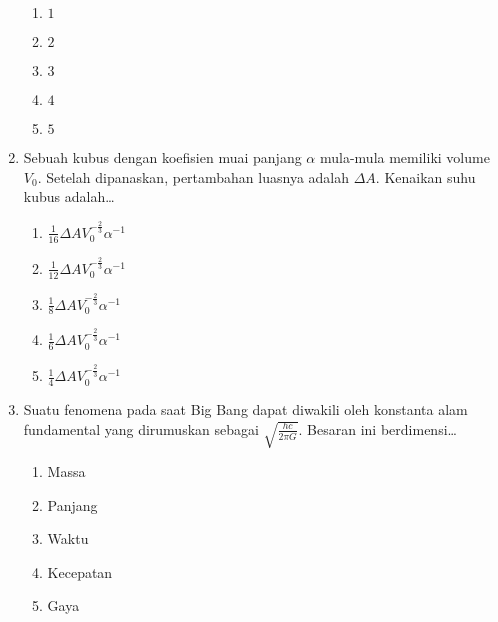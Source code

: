 \documentclass[A4,12PT, english, twocolumn]{journal}
\begin{document}
\begin{enumerate}
\begin{center}
\end{center}
    \begin{enumerate}
        \item $1$
        \item $2$
        \item $3$
        \item $4$
        \item $5$
    \end{enumerate}

\item Sebuah kubus dengan koefisien muai panjang $\alpha$ mula-mula memiliki volume $V_0$. Setelah dipanaskan, pertambahan luasnya adalah $\Delta A$. Kenaikan suhu kubus adalah\dots
    \begin{enumerate}
        \item $\frac{1}{16}\Delta AV_0^{-\frac{2}{3}}\alpha^{-1}$
        \item $\frac{1}{12}\Delta AV_0^{-\frac{2}{3}}\alpha^{-1}$
        \item $\frac{1}{8}\Delta AV_0^{-\frac{2}{3}}\alpha^{-1}$
        \item $\frac{1}{6}\Delta AV_0^{-\frac{2}{3}}\alpha^{-1}$
        \item $\frac{1}{4}\Delta AV_0^{-\frac{2}{3}}\alpha^{-1}$
    \end{enumerate}

\item Suatu fenomena pada saat Big Bang dapat diwakili oleh konstanta alam fundamental yang dirumuskan sebagai $\sqrt{\frac{hc}{2\pi G}}$. Besaran ini berdimensi\dots
    \begin{enumerate}
        \item Massa
        \item Panjang
        \item Waktu
        \item Kecepatan
        \item Gaya
    \end{enumerate}


\end{enumerate}
\end{document}
